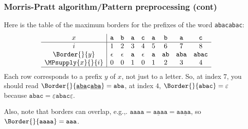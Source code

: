 %
\begin{frame}
\frametitle{Morris-Pratt algorithm/Pattern preprocessing (cont)}

Here is the table of the maximum borders for the prefixes of the word
\texttt{abacabac}:
\[
\begin{array}{c|ccccccccc|}
x & \texttt{a} & \texttt{b} & \texttt{a} & \texttt{c} 
 & \texttt{a} & \texttt{b} & \texttt{a} & \texttt{c}\\
\hline
  i
& 1 & 2 & 3 & 4 & 5 & 6 & 7 & 8\\
  \Border{}{y}
& \epsilon & \epsilon & \texttt{a} 
& \epsilon & \texttt{a} & \texttt{ab} & \texttt{aba} & \texttt{abac}\\ 
  \MPsupply{x}{}{i}
& 0 & 0 & 1 & 0 & 1 & 2 & 3 & 4\\
\hline
\end{array}
\]
Each row corresponds to a prefix \(y\) of \(x\), not just to a
letter. So, at index \(7\), you should read \(
\Border{}{\underline{\texttt{aba}}\texttt{c}\underline{\texttt{aba}}}
= \texttt{aba} \), at index \(4\), \(\Border{}{\texttt{abac}} =
\varepsilon\) because \(\texttt{abac} =
\underline{\varepsilon}\texttt{abac}\underline{\varepsilon}\).

\bigskip

\noindent Also, note that borders can overlap, e.g.,. \(\texttt{aaaa}
= \underline{\texttt{aaa}}\texttt{a} =
\texttt{a}\underline{\texttt{aaa}}\), so \(\Border{}{\texttt{aaaa}} =
\texttt{aaa}\).

\end{frame}

